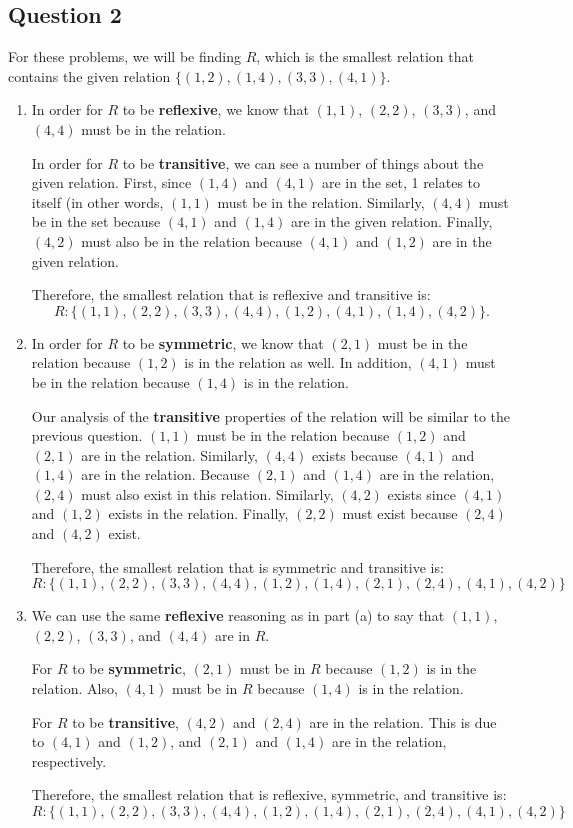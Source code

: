 \documentclass[letterpaper, 12pt]{article}
\begin{document}
\subsection*{Question 2}
For these problems, we will be finding $R$, which is the smallest relation that contains the given relation $\{(1, 2),(1, 4),(3, 3),(4, 1)\}$.
\begin{enumerate}
    \item In order for $R$ to be \textbf{reflexive}, we know that $(1,1)$, $(2,2)$, $(3,3)$, and $(4,4)$ must be in the relation.
    
    In order for $R$ to be \textbf{transitive}, we can see a number of things about the given relation. First, since $(1,4)$ and $(4,1)$ are in the set, 1 relates to itself (in other words, $(1,1)$ must be in the relation. Similarly, $(4,4)$ must be in the set because $(4,1)$ and $(1,4)$ are in the given relation. Finally, $(4,2)$ must also be in the relation because $(4,1)$ and $(1,2)$ are in the given relation.
    
    Therefore, the smallest relation that is reflexive and transitive is:
    \[R: \{(1,1), (2,2), (3,3), (4,4), (1,2), (4,1), (1,4), (4,2)\}.\]
    
    \item In order for $R$ to be \textbf{symmetric}, we know that $(2,1)$ must be in the relation because $(1,2)$ is in the relation as well. In addition, $(4,1)$ must be in the relation because $(1,4)$ is in the relation.
    
    Our analysis of the \textbf{transitive} properties of the relation will be similar to the previous question. $(1,1)$ must be in the relation because $(1,2)$ and $(2,1)$ are in the relation. Similarly, $(4,4)$ exists because $(4,1)$ and $(1,4)$ are in the relation. Because $(2,1)$ and $(1,4)$ are in the relation, $(2,4)$ must also exist in this relation. Similarly, $(4,2)$ exists since $(4,1)$ and $(1,2)$ exists in the relation. Finally, $(2,2)$ must exist because $(2,4)$ and $(4,2)$ exist.
    
    Therefore, the smallest relation that is symmetric and transitive is:
    \[R: \{(1,1), (2,2), (3,3), (4,4), (1,2), (1,4), (2,1), (2,4), (4,1), (4,2)\}\]
    
    \item We can use the same \textbf{reflexive} reasoning as in part (a) to say that $(1,1)$, $(2,2)$, $(3,3)$, and $(4,4)$ are in $R$.
    
    For $R$ to be \textbf{symmetric}, $(2,1)$ must be in $R$ because $(1,2)$ is in the relation. Also, $(4,1)$ must be in $R$ because $(1,4)$ is in the relation.
    
    For $R$ to be \textbf{transitive}, $(4,2)$ and $(2,4)$ are in the relation. This is due to $(4,1)$ and $(1,2)$, and $(2,1)$ and $(1,4)$ are in the relation, respectively.
    
    Therefore, the smallest relation that is reflexive, symmetric, and transitive is:
    \[R: \{(1,1), (2,2), (3,3), (4,4), (1,2), (1,4), (2,1), (2,4), (4,1), (4,2)\}\]
\end{enumerate}
\end{document}
